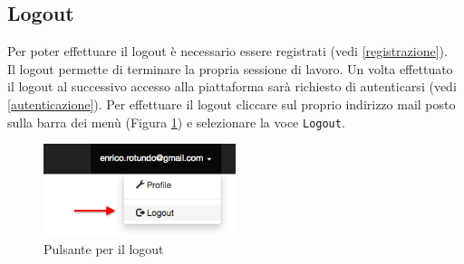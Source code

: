 	\clearpage
	\subsection{Logout}
		\label{logout}

			Per poter effettuare il logout è necessario essere registrati (vedi \ref{registrazione}). \\
			Il logout permette di terminare la propria sessione di lavoro. Un volta effettuato il logout al successivo accesso alla piattaforma sarà richiesto di autenticarsi (vedi \ref{autenticazione}). Per effettuare il logout cliccare sul proprio indirizzo mail posto sulla barra dei menù (Figura \ref{fig:logout}) e selezionare la voce \texttt{Logout}.

			\begin{figure}[H]
				\centering \includegraphics[width=0.5\textwidth]{img/logout.png}
			\caption{ \label{fig:logout} Pulsante per il logout}
			\end{figure}

	\clearpage
